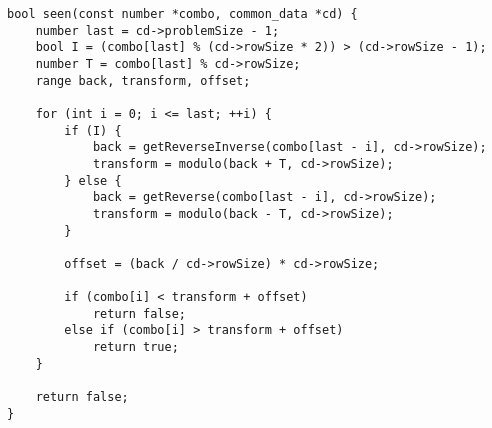 \begin{lstlisting}[caption={Determining whether a top has already been seen.},label={seen}]
bool seen(const number *combo, common_data *cd) {
    number last = cd->problemSize - 1;
    bool I = (combo[last] % (cd->rowSize * 2)) > (cd->rowSize - 1);
    number T = combo[last] % cd->rowSize;
    range back, transform, offset;

    for (int i = 0; i <= last; ++i) {
        if (I) {
            back = getReverseInverse(combo[last - i], cd->rowSize);
            transform = modulo(back + T, cd->rowSize);
        } else {
            back = getReverse(combo[last - i], cd->rowSize);
            transform = modulo(back - T, cd->rowSize);
        }

        offset = (back / cd->rowSize) * cd->rowSize;

        if (combo[i] < transform + offset)
            return false;
        else if (combo[i] > transform + offset)
            return true;
    }

    return false;
}
\end{lstlisting}

